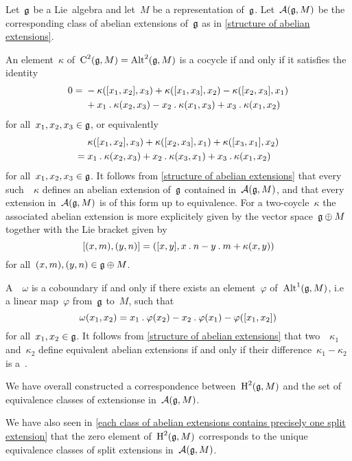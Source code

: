 \begin{fluff}
	Let~$\mathfrak{g}$ be a Lie~algebra and let~$M$ be a representation of~$\mathfrak{g}$.
	Let~$\mathcal{A}(\mathfrak{g}, M)$ be the corresponding class of abelian extensions of~$\mathfrak{g}$ as in \cref{structure of abelian extensions}.

	An element~$\kappa$ of~$\operatorname{C}^2(\mathfrak{g}, M) = \operatorname{Alt}^2(\mathfrak{g}, M)$ is a cocycle if and only if it satisfies the identity
	\begin{align*}
		0
		={}&
		- \kappa([x_1, x_2], x_3)
		+ \kappa([x_1, x_3], x_2)
		- \kappa([x_2, x_3], x_1)
		\\
		{}&
		+ x_1 \mathbin{.} \kappa(x_2, x_3)
		- x_2 \mathbin{.} \kappa(x_1, x_3)
		+ x_3 \mathbin{.} \kappa(x_1, x_2)
	\end{align*}
	for all~$x_1, x_2, x_3 \in \mathfrak{g}$, or equivalently
	\begin{align*}
		{}&
		\kappa([x_1, x_2], x_3)
		+ \kappa([x_2, x_3], x_1)
		+ \kappa([x_3, x_1], x_2)
		\\
		={}&
		x_1 \mathbin{.} \kappa(x_2, x_3)
		+ x_2 \mathbin{.} \kappa(x_3, x_1)
		+ x_3 \mathbin{.} \kappa(x_1, x_2)
	\end{align*}
	for all~$x_1, x_2, x_3 \in \mathfrak{g}$.
	It follows from \cref{structure of abelian extensions} that every such~~$\kappa$ defines an abelian extension of~$\mathfrak{g}$ contained in~$\mathcal{A}(\mathfrak{g}, M)$, and that every extension in~$\mathcal{A}(\mathfrak{g}, M)$ is of this form up to equivalence.
	For a two-coycle~$\kappa$ the associated abelian extension is more explicitely given by the vector space~$\mathfrak{g} \oplus M$ together with the Lie bracket given by
	\[
		[(x, m), (y, n)]
		=
		( [x,y], x \mathbin{.} n - y \mathbin{.} m + \kappa(x,y) )
	\]
	for all~$(x,m), (y,n) \in \mathfrak{g} \oplus M$.

	A~~$\omega$ is a coboundary if and only if there exists an element~$\varphi$ of~$\operatorname{Alt}^1(\mathfrak{g}, M)$, i.e a linear map~$\varphi$ from~$\mathfrak{g}$ to~$M$, such that
	\[
		\omega(x_1, x_2)
		=
		x_1 \mathbin{.} \varphi(x_2)
		- x_2 \mathbin{.} \varphi(x_1)
		- \varphi( [x_1, x_2] )
	\]
	for all~$x_1, x_2 \in \mathfrak{g}$.
	It follows from \cref{structure of abelian extensions} that two~~$\kappa_1$ and~$\kappa_2$ define equivalent abelian extensions if and only if their difference~$\kappa_1 - \kappa_2$ is a~.

	We have overall constructed a {\onetoonetext} correspondence between~$\operatorname{H}^2(\mathfrak{g}, M)$ and the set of equivalence classes of extensionse in~$\mathcal{A}(\mathfrak{g}, M)$.

	We have also seen in \cref{each class of abelian extensions contains precisely one split extension} that the zero element of~$\operatorname{H}^2(\mathfrak{g}, M)$ corresponds to the unique equivalence classes of split extensions in~$\mathcal{A}(\mathfrak{g}, M)$.
\end{fluff}


